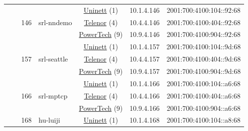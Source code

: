 \begin{small}
\begin{center}
\begin{longtable}{|c|c|c|c|c|c|c|c|}
  &  & \multirow{3}{*}{\tiny{146}} & \multicolumn{1}{|l|}{\multirow{3}{*}{\tiny{srl-nndemo}}} & \multicolumn{2}{|c|}{\tiny{\href{https://www.uninett.no}{Uninett} (1)}} & \tiny{10.1.4.146} & \tiny{2001:700:4100:104::92:68} \\* \cline{5-5}\cline{6-6}\cline{7-7}\cline{8-8}
  &  &  &  & \multicolumn{2}{|c|}{\tiny{\href{https://www.telenor.no}{Telenor} (4)}} & \tiny{10.4.4.146} & \tiny{2001:700:4100:404::92:68} \\* \cline{5-5}\cline{6-6}\cline{7-7}\cline{8-8}
  &  &  &  & \multicolumn{2}{|c|}{\tiny{\href{http://www.powertech.no}{PowerTech} (9)}} & \tiny{10.9.4.146} & \tiny{2001:700:4100:904::92:68} \\* \cline{3-3}\cline{4-4}\cline{5-5}\cline{6-6}\cline{7-7}\cline{8-8}
  &  & \multirow{3}{*}{\tiny{157}} & \multicolumn{1}{|l|}{\multirow{3}{*}{\tiny{srl-seattle}}} & \multicolumn{2}{|c|}{\tiny{\href{https://www.uninett.no}{Uninett} (1)}} & \tiny{10.1.4.157} & \tiny{2001:700:4100:104::9d:68} \\* \cline{5-5}\cline{6-6}\cline{7-7}\cline{8-8}
  &  &  &  & \multicolumn{2}{|c|}{\tiny{\href{https://www.telenor.no}{Telenor} (4)}} & \tiny{10.4.4.157} & \tiny{2001:700:4100:404::9d:68} \\* \cline{5-5}\cline{6-6}\cline{7-7}\cline{8-8}
  &  &  &  & \multicolumn{2}{|c|}{\tiny{\href{http://www.powertech.no}{PowerTech} (9)}} & \tiny{10.9.4.157} & \tiny{2001:700:4100:904::9d:68} \\* \cline{3-3}\cline{4-4}\cline{5-5}\cline{6-6}\cline{7-7}\cline{8-8}
  &  & \multirow{3}{*}{\tiny{166}} & \multicolumn{1}{|l|}{\multirow{3}{*}{\tiny{srl-mptcp}}} & \multicolumn{2}{|c|}{\tiny{\href{https://www.uninett.no}{Uninett} (1)}} & \tiny{10.1.4.166} & \tiny{2001:700:4100:104::a6:68} \\* \cline{5-5}\cline{6-6}\cline{7-7}\cline{8-8}
  &  &  &  & \multicolumn{2}{|c|}{\tiny{\href{https://www.telenor.no}{Telenor} (4)}} & \tiny{10.4.4.166} & \tiny{2001:700:4100:404::a6:68} \\* \cline{5-5}\cline{6-6}\cline{7-7}\cline{8-8}
  &  &  &  & \multicolumn{2}{|c|}{\tiny{\href{http://www.powertech.no}{PowerTech} (9)}} & \tiny{10.9.4.166} & \tiny{2001:700:4100:904::a6:68} \\* \cline{3-3}\cline{4-4}\cline{5-5}\cline{6-6}\cline{7-7}\cline{8-8}
  &  & \multirow{3}{*}{\tiny{168}} & \multicolumn{1}{|l|}{\multirow{3}{*}{\tiny{hu-luiji}}} & \multicolumn{2}{|c|}{\tiny{\href{https://www.uninett.no}{Uninett} (1)}} & \tiny{10.1.4.168} & \tiny{2001:700:4100:104::a8:68} \\* \cline{5-5}\cline{6-6}\cline{7-7}\cline{8-8}

\end{longtable}
\end{center}
\end{small}
